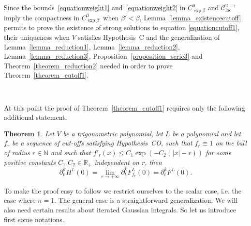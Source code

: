 \documentclass[a4paper,10pt]{article}
\newcommand{\tmop}[1]{\ensuremath{\operatorname{#1}}}
\newtheorem{theorem}{Theorem}
\begin{document}
Since the bounds~{\eqref{equationweight1}} and~{\eqref{equationweight2}} in
$C_{\exp \beta}^0$ and $\mathcal{C}^{2 - \tau}_{\tmop{loc}}$ imply the
compactness in $C^0_{\exp \beta'}$ when $\beta' < \beta$,
Lemma~\ref{lemma_existencecutoff} permits to prove the existence of strong
solutions to equation {\eqref{equationcutoff1}}, their uniqueness when $V$
satisfies Hypothesis~C and the generalization of Lemma~\ref{lemma_reduction1},
Lemma~\ref{lemma_reduction2}, Lemma~\ref{lemma_reduction3},
Proposition~\ref{proposition_serie3} and Theorem~\ref{theorem_reduction2}
needed in order to prove Theorem~\ref{theorem_cutoff1}.

\

At this point the proof of Theorem~\ref{theorem_cutoff1} requires only the
following additional statement.

\begin{theorem}
  \label{theorem_gaussian1}Let $V$ be a trigonometric polynomial, let $L$ be a
  polynomial and let $f_r$ be a sequence of cut-offs satisfying Hypothesis~CO,
  such that $f_r \equiv 1$ on the ball of radius $r \in \mathbb{N}$ and such
  that $f'_r (x) \leqslant C_1 \exp (- C_2 (| x | - r))$ for some positive
  constants $C_{1,} C_2 \in \mathbb{R}_+$ independent on $r$, then
  \[ \partial_t^k H^L (0) = \lim_{r \rightarrow + \infty} \partial^k_t
     F^L_{f_r} (0) = \partial^k_t F^L (0) . \]
\end{theorem}

To make the proof easy to follow we restrict ourselves to the scalar case,
i.e. the case where $n = 1$. The general case is a straightforward
generalization. We will also need certain results about iterated Gaussian
integrals. So let us introduce first some notations.

\
\end{document}
